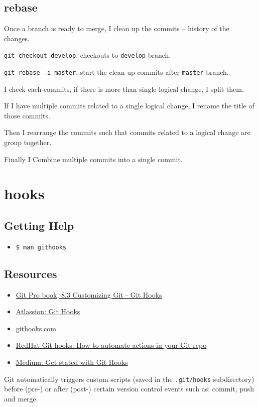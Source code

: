 \subsection{rebase} \label{git_rebase}
Once a branch is ready to merge, I clean up the commits -- history of the changes. 


\texttt{git checkout develop}, checkouts to \texttt{develop} branch.

\texttt{git rebase -i master}, start the clean up commits after \texttt{master} branch.

I check each commits, if there is more than single logical change, I split them.

If I have multiple commits related to a single logical change, I rename the title of those commits.

Then I rearrange the commits such that commits related to a logical change are group together.

Finally I Combine multiple commits into a single commit.





\section{hooks}
\subsection{Getting Help}%
\begin{itemize}
  \item \texttt{\$ man githooks}
\end{itemize}

\subsection{Resources}%
\begin{itemize}
  \item \href{https://git-scm.com/book/en/v2/Customizing-Git-Git-Hooks}{Git Pro book, 8.3 Customizing Git - Git Hooks} 
  \item \href{https://www.atlassian.com/git/tutorials/git-hooks}{Atlassion: Git Hooks} 
  \item \href{https://githooks.com/}{githooks.com} 
  \item \href{https://www.redhat.com/sysadmin/git-hooks}{RedHat Git hooks: How to automate actions in your Git repo}
  \item \href{https://medium.com/@f3igao/get-started-with-git-hooks-5a489725c639}{Medium: Get stated with Git Hooks} 
\end{itemize}
Git automatically triggers custom scripts (saved in the \texttt{.git/hooks} subdirectory) before (pre-) or after (post-) certain version control events such as: commit, push and merge.

